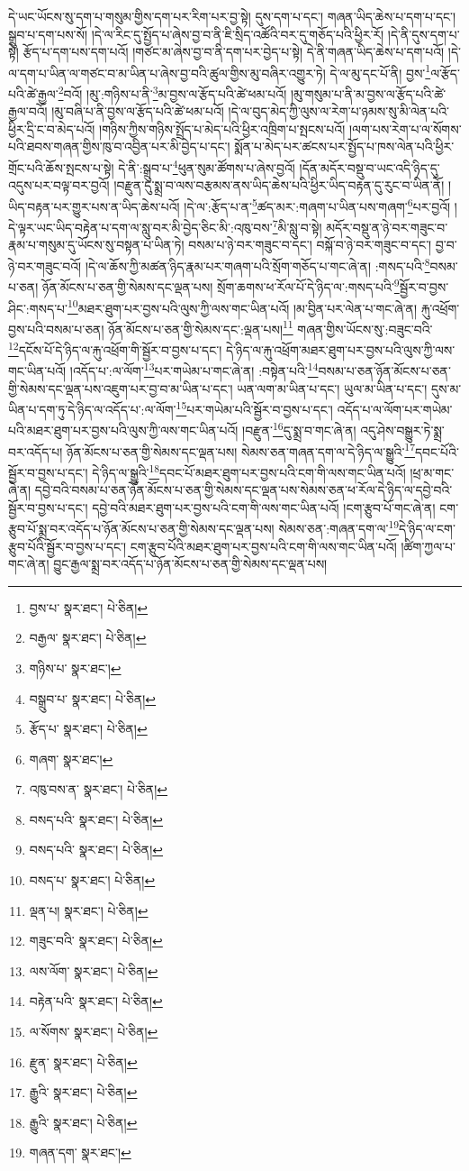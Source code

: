 དེ་ཡང་ཡོངས་སུ་དག་པ་གསུམ་གྱིས་དག་པར་རིག་པར་བྱ་སྟེ། དུས་དག་པ་དང་། གཞན་ཡིད་ཆེས་པ་དག་པ་དང་། སྒྲུབ་པ་དག་པས་སོ། །དེ་ལ་རིང་དུ་སྤྱོད་པ་ཞེས་བྱ་བ་ནི་ཇི་སྲིད་འཚོའི་བར་དུ་གཅོད་པའི་ཕྱིར་རོ། །དེ་ནི་དུས་དག་པ་སྟེ། རྩོད་པ་དག་པས་དག་པའོ། །གཙང་མ་ཞེས་བྱ་བ་ནི་དག་པར་བྱེད་པ་སྟེ། དེ་ནི་གཞན་ཡིད་ཆེས་པ་དག་པའོ། །དེ་ལ་དག་པ་ཡིན་ལ་གཙང་བ་མ་ཡིན་པ་ཞེས་བྱ་བའི་ཚུལ་གྱིས་མུ་བཞིར་འགྱུར་ཏེ། དེ་ལ་མུ་དང་པོ་ནི། བྱས་\footnote{བྱས་པ་  སྣར་ཐང་།  པེ་ཅིན། }ལ་རྩོད་པའི་ཚེ་རྒྱལ་\footnote{བརྒྱལ་  སྣར་ཐང་།  པེ་ཅིན། }བའོ། །མུ་:གཉིས་པ་ནི་\footnote{གཉིས་པ་  སྣར་ཐང་། }མ་བྱས་ལ་རྩོད་པའི་ཚེ་ཕམ་པའོ། །མུ་གསུམ་པ་ནི་མ་བྱས་ལ་རྩོད་པའི་ཚེ་རྒྱལ་བའོ། །མུ་བཞི་པ་ནི་བྱས་ལ་རྩོད་པའི་ཚེ་ཕམ་པའོ། །དེ་ལ་བུད་མེད་ཀྱི་ལུས་ལ་རེག་པ་ཉམས་སུ་མི་ལེན་པའི་ཕྱིར་དྲི་ང་བ་མེད་པའོ། །གཉིས་ཀྱིས་གཉིས་སྤྲོད་པ་མེད་པའི་ཕྱིར་འཁྲིག་པ་སྤངས་པའོ། །ལག་པས་རེག་པ་ལ་སོགས་པའི་ཐབས་གཞན་གྱིས་ཁུ་བ་འབྱིན་པར་མི་བྱེད་པ་དང་། སྨོན་པ་མེད་པར་ཚངས་པར་སྤྱོད་པ་ཁས་ལེན་པའི་ཕྱིར་གྲོང་པའི་ཆོས་སྤངས་པ་སྟེ། དེ་ནི་:སྒྲུབ་པ་\footnote{བསྒྲུབ་པ་  སྣར་ཐང་།  པེ་ཅིན། }ཕུན་སུམ་ཚོགས་པ་ཞེས་བྱའོ། །དོན་མདོར་བསྡུ་བ་ཡང་འདི་ཉིད་དུ་འདུས་པར་བལྟ་བར་བྱའོ། །བརྫུན་དུ་སྨྲ་བ་ལས་བརྩམས་ནས་ཡིད་ཆེས་པའི་ཕྱིར་ཡིད་བརྟན་དུ་རུང་བ་ཡིན་ནོ། །ཡིད་བརྟན་པར་གྱུར་པས་ན་ཡིད་ཆེས་པའོ། །དེ་ལ་:རྩོད་པ་ན་\footnote{རྩོད་པ་  སྣར་ཐང་།  པེ་ཅིན། }ཚད་མར་:གཞག་པ་ཡིན་པས་གཞག་\footnote{གཞག་  སྣར་ཐང་། }པར་བྱའོ། །དེ་ལྟར་ཡང་ཡིད་བརྟེན་པ་དག་ལ་སླུ་བར་མི་བྱེད་ཅིང་མི་:འཁུ་བས་\footnote{འཁུ་བས་ན་  སྣར་ཐང་།  པེ་ཅིན། }མི་སླུ་བ་སྟེ། མདོར་བསྡུ་ན་ཉེ་བར་གཟུང་བ་རྣམ་པ་གསུམ་དུ་ཡོངས་སུ་བསྟན་པ་ཡིན་ཏེ། བསམ་པ་ཉེ་བར་གཟུང་བ་དང་། བསྐོ་བ་ཉེ་བར་གཟུང་བ་དང་། བྱ་བ་ཉེ་བར་གཟུང་བའོ། །དེ་ལ་ཆོས་ཀྱི་མཚན་ཉིད་རྣམ་པར་གཞག་པའི་སྲོག་གཅོད་པ་གང་ཞེ་ན། :གསད་པའི་\footnote{བསད་པའི་  སྣར་ཐང་།  པེ་ཅིན། }བསམ་པ་ཅན། ཉོན་མོངས་པ་ཅན་གྱི་སེམས་དང་ལྡན་པས། སྲོག་ཆགས་ཕ་རོལ་པོ་དེ་ཉིད་ལ་:གསད་པའི་\footnote{བསད་པའི་  སྣར་ཐང་།  པེ་ཅིན། }སྦྱོར་བ་བྱས་ཤིང་:གསད་པ་\footnote{བསད་པ་  སྣར་ཐང་།  པེ་ཅིན། }མཐར་ཐུག་པར་བྱས་པའི་ལུས་ཀྱི་ལས་གང་ཡིན་པའོ། །མ་བྱིན་པར་ལེན་པ་གང་ཞེ་ན། རྐུ་འཕྲོག་བྱས་པའི་བསམ་པ་ཅན། ཉོན་མོངས་པ་ཅན་གྱི་སེམས་དང་:ལྡན་པས།\footnote{ལྡན་པ།  སྣར་ཐང་།  པེ་ཅིན། } གཞན་གྱིས་ཡོངས་སུ་:བཟུང་བའི་\footnote{གཟུང་བའི་  སྣར་ཐང་།  པེ་ཅིན། }དངོས་པོ་དེ་ཉིད་ལ་རྐུ་འཕྲོག་གི་སྦྱོར་བ་བྱས་པ་དང་། དེ་ཉིད་ལ་རྐུ་འཕྲོག་མཐར་ཐུག་པར་བྱས་པའི་ལུས་ཀྱི་ལས་གང་ཡིན་པའོ། །འདོད་པ་:ལ་ལོག་\footnote{ལས་ལོག་  སྣར་ཐང་།  པེ་ཅིན། }པར་གཡེམ་པ་གང་ཞེ་ན། :བསྟེན་པའི་\footnote{བརྟེན་པའི་  སྣར་ཐང་།  པེ་ཅིན། }བསམ་པ་ཅན་ཉོན་མོངས་པ་ཅན་གྱི་སེམས་དང་ལྡན་པས་འཇུག་པར་བྱ་བ་མ་ཡིན་པ་དང་། ཡན་ལག་མ་ཡིན་པ་དང་། ཡུལ་མ་ཡིན་པ་དང་། དུས་མ་ཡིན་པ་དག་ཏུ་དེ་ཉིད་ལ་འདོད་པ་:ལ་ལོག་\footnote{ལ་སོགས་  སྣར་ཐང་།  པེ་ཅིན། }པར་གཡེམ་པའི་སྦྱོར་བ་བྱས་པ་དང་། འདོད་པ་ལ་ལོག་པར་གཡེམ་པའི་མཐར་ཐུག་པར་བྱས་པའི་ལུས་ཀྱི་ལས་གང་ཡིན་པའོ། །བརྫུན་\footnote{རྫུན་  སྣར་ཐང་།  པེ་ཅིན། }དུ་སྨྲ་བ་གང་ཞེ་ན། འདུ་ཤེས་བསྒྱུར་ཏེ་སྨྲ་བར་འདོད་པ། ཉོན་མོངས་པ་ཅན་གྱི་སེམས་དང་ལྡན་པས། སེམས་ཅན་གཞན་དག་ལ་དེ་ཉིད་ལ་སྒྱུའི་\footnote{རྒྱུའི་  སྣར་ཐང་།  པེ་ཅིན། }དབང་པོའི་སྦྱོར་བ་བྱས་པ་དང་། དེ་ཉིད་ལ་སྒྱུའི་\footnote{རྒྱུའི་  སྣར་ཐང་།  པེ་ཅིན། }དབང་པོ་མཐར་ཐུག་པར་བྱས་པའི་ངག་གི་ལས་གང་ཡིན་པའོ། །ཕྲ་མ་གང་ཞེ་ན། དབྱེ་བའི་བསམ་པ་ཅན་ཉོན་མོངས་པ་ཅན་གྱི་སེམས་དང་ལྡན་པས་སེམས་ཅན་ཕ་རོལ་དེ་ཉིད་ལ་དབྱེ་བའི་སྦྱོར་བ་བྱས་པ་དང་། དབྱེ་བའི་མཐར་ཐུག་པར་བྱས་པའི་ངག་གི་ལས་གང་ཡིན་པའོ། །ངག་རྩུབ་པོ་གང་ཞེ་ན། ངག་རྩུབ་པོ་སྨྲ་བར་འདོད་པ་ཉོན་མོངས་པ་ཅན་གྱི་སེམས་དང་ལྡན་པས། སེམས་ཅན་:གཞན་དག་ལ་\footnote{གཞན་དག་  སྣར་ཐང་། }དེ་ཉིད་ལ་ངག་རྩུབ་པོའི་སྦྱོར་བ་བྱས་པ་དང་། ངག་རྩུབ་པོའི་མཐར་ཐུག་པར་བྱས་པའི་ངག་གི་ལས་གང་ཡིན་པའོ། །ཚིག་ཀྱལ་པ་གང་ཞེ་ན། བྱུང་རྒྱལ་སྨྲ་བར་འདོད་པ་ཉོན་མོངས་པ་ཅན་གྱི་སེམས་དང་ལྡན་པས། 